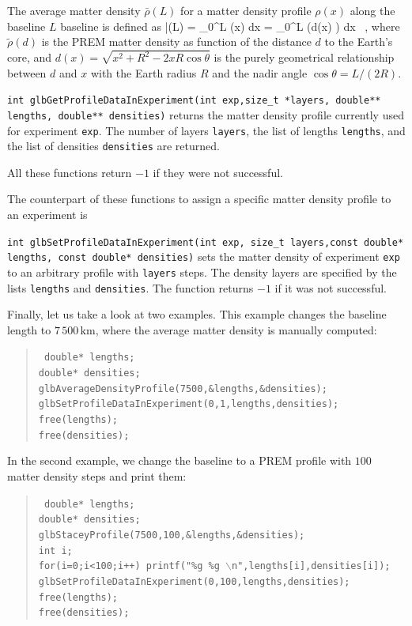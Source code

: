 The average matter density $\bar{\rho}(L)$ for a matter density profile $\rho(x)$ along the baseline $L$ baseline is defined as
\be
\bar{\rho}(L) =  \int\limits_{0}^L \rho(x) dx = 
 \int\limits_{0}^L \tilde{\rho}\left(d(x) \right) dx \, , 
\ee
where $\tilde{\rho}(d)$ is the PREM matter density as function of the
distance $d$ to the Earth's core, and $d(x)=\sqrt{x^2+R^2-2 x R \cos \theta }$ is the purely geometrical relationship between $d$ and $x$ with the
Earth radius $R$ and the nadir angle $\cos \theta = L/(2 R)$.
\begin{function}
{\tt int glbGetProfileDataInExperiment(int exp,size\_t *layers, double** lengths, double** densities)} returns the matter density profile 
currently used for experiment {\tt exp}. The number of layers {\tt layers}, the list of lengths {\tt lengths}, and the list of densities {\tt densities} are returned.
\end{function}
All these functions return $-1$ if they were not successful.

The counterpart of these functions to assign a specific matter density
profile to an experiment is
\begin{function}
{\tt int glbSetProfileDataInExperiment(int exp, size\_t layers,const double* lengths, const double* densities)} sets the matter density of experiment
{\tt exp} to an arbitrary profile with {\tt layers} steps. The density
layers are specified by the lists {\tt lengths} and {\tt densities}.
The function returns $-1$ if it was not successful.
\end{function}

Finally, let us take a look at two examples. This example changes
the baseline length to $7\,500 \, \mathrm{km}$, where the average 
matter density is manually computed:
\begin{quote}
{\tt  
  double* lengths; \\
  double* densities; \\
  glbAverageDensityProfile(7500,\&lengths,\&densities); \\
  glbSetProfileDataInExperiment(0,1,lengths,densities); \\
  free(lengths); \\
  free(densities); \\
}
\end{quote}
In the second example, we change the baseline to a PREM profile with
$100$ matter density steps and print them:
\begin{quote}
{\tt
  double* lengths; \\
  double* densities; \\
  glbStaceyProfile(7500,100,\&lengths,\&densities); \\
  int i; \\
  for(i=0;i<100;i++) printf("\%g \%g $\backslash$n",lengths[i],densities[i]); \\
  glbSetProfileDataInExperiment(0,100,lengths,densities); \\
  free(lengths);\\
  free(densities);\\
}
\end{quote}

